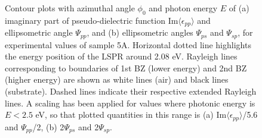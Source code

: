 \begin{figure}
    \label{fig:Appendix_S5A_contourplots}
    \caption{Contour plots with azimuthal angle $\phi_0$ and photon energy $E$ of (a) imaginary part of pseudo-dielectric function $\text{Im}\langle\epsilon_{pp}\rangle$ and ellipsometric angle $\Psi_{pp}$, and (b) ellipsometric angles $\Psi_{ps}$ and $\Psi_{sp}$, for experimental values of sample 5A. Horizontal dotted line highlights the energy position of the LSPR around 2.08 eV. Rayleigh lines corresponding to boundaries of 1st BZ (lower energy) and 2nd BZ (higher energy) are shown as white lines (air) and black lines (substrate). Dashed lines indicate their respective extended Rayleigh lines. A scaling has been applied for values where photonic energy is $E<2.5$ eV, so that plotted quantities in this range is (a) $\text{Im}\langle\epsilon_{pp}\rangle$/5.6 and $\Psi_{pp}$/2, (b) 2$\Psi_{ps}$ and 2$\Psi_{sp}$.}
\end{figure}